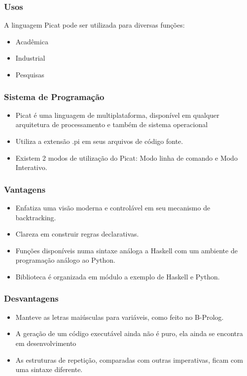 \documentclass{beamer}
\begin{document}

\begin{frame}
    \frametitle{Usos}
    A linguagem Picat pode ser utilizada para diversas funções:
    \begin{itemize}
     \item Acadêmica
     \item Industrial
     \item Pesquisas
    \end{itemize}
\end{frame}



\begin{frame}
    \frametitle{Sistema de Programação}
    \begin{itemize}
     \item Picat é uma linguagem de multiplataforma, disponível em qualquer arquitetura de processamento e também de sistema operacional
     \item Utiliza a extensão .pi em seus arquivos de código fonte. 
     \item Existem 2 modos de utilização do Picat: Modo linha de comando e Modo Interativo. 
    \end{itemize}
\end{frame}


\begin{frame}
    \frametitle{Vantagens}
    \begin{itemize}
     \item Enfatiza uma visão moderna e controlável em seu mecanismo de backtracking.
     \item Clareza em construir regras declarativas.
     \item Funções disponíveis numa sintaxe análoga a Haskell com um ambiente de programação análogo ao Python.
     \item Biblioteca é organizada em módulo a exemplo de Haskell e Python. 
    \end{itemize}
\end{frame}


\begin{frame}
    \frametitle{Desvantagens}
    \begin{itemize}
     \item Manteve as letras maiúsculas para variáveis, como feito no B-Prolog.
     \item A geração de um código executável ainda não é puro, ela ainda se encontra em desenvolvimento
     \item As estruturas de repetição, comparadas com outras imperativas, ficam com uma sintaxe diferente. 
    \end{itemize}
\end{frame}
\end{document}
